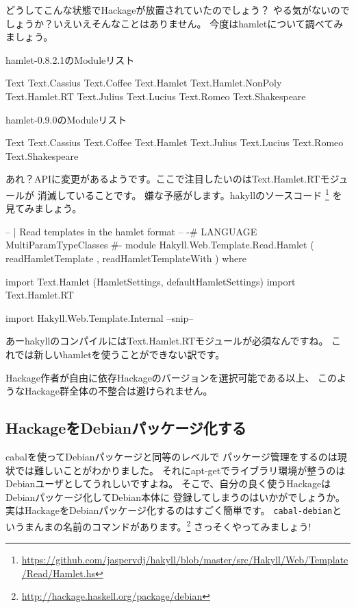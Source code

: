 \documentclass[mingoth,a4paper]{jsarticle}
\begin{document}
どうしてこんな状態でHackageが放置されていたのでしょう？
やる気がないのでしょうか？いえいえそんなことはありません。
今度はhamletについて調べてみましょう。

\begin{multicols}{2}
hamlet-0.8.2.1のModuleリスト
\begin{commandline}
Text
  Text.Cassius
  Text.Coffee
  Text.Hamlet
    Text.Hamlet.NonPoly
    Text.Hamlet.RT
  Text.Julius
  Text.Lucius
  Text.Romeo
  Text.Shakespeare
\end{commandline}
\columnbreak
hamlet-0.9.0のModuleリスト
\begin{commandline}
Text
  Text.Cassius
  Text.Coffee
  Text.Hamlet
  Text.Julius
  Text.Lucius
  Text.Romeo
  Text.Shakespeare
\end{commandline}
\end{multicols}

あれ？APIに変更があるようです。ここで注目したいのはText.Hamlet.RTモジュールが
消滅していることです。
嫌な予感がします。hakyllのソースコード
\footnote{\url{https://github.com/jaspervdj/hakyll/blob/master/src/Hakyll/Web/Template/Read/Hamlet.hs}}
を見てみましょう。

\begin{commandline}
-- | Read templates in the hamlet format
--
{-# LANGUAGE MultiParamTypeClasses #-}
module Hakyll.Web.Template.Read.Hamlet
    ( readHamletTemplate
    , readHamletTemplateWith
    ) where

import Text.Hamlet (HamletSettings, defaultHamletSettings)
import Text.Hamlet.RT

import Hakyll.Web.Template.Internal
--snip--
\end{commandline}

あーhakyllのコンパイルにはText.Hamlet.RTモジュールが必須なんですね。
これでは新しいhamletを使うことができない訳です。

Hackage作者が自由に依存Hackageのバージョンを選択可能である以上、
このようなHackage群全体の不整合は避けられません。

\subsection{HackageをDebianパッケージ化する}

cabalを使ってDebianパッケージと同等のレベルで
パッケージ管理をするのは現状では難しいことがわかりました。
それにapt-getでライブラリ環境が整うのはDebianユーザとしてうれしいですよね。
そこで、自分の良く使うHackageはDebianパッケージ化してDebian本体に
登録してしまうのはいかがでしょうか。
実はHackageをDebianパッケージ化するのはすごく簡単です。
\texttt{cabal-debian}というまんまの名前のコマンドがあります。\footnote{\url{http://hackage.haskell.org/package/debian}}
さっそくやってみましょう!
\end{document}
